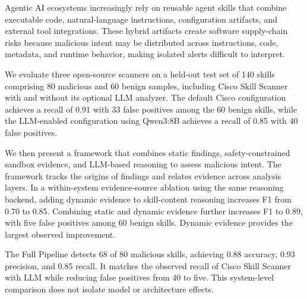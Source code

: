 Agentic AI ecosystems increasingly rely on reusable agent skills
that combine executable code, natural-language instructions,
configuration artifacts, and external tool integrations.
These hybrid artifacts create software supply-chain risks
because malicious intent may be distributed across instructions,
code, metadata, and runtime behavior, making isolated alerts
difficult to interpret.

We evaluate three open-source scanners on a held-out test set
of 140 skills comprising 80 malicious and 60 benign samples,
including Cisco Skill Scanner with and without its
optional LLM analyzer. The default Cisco configuration achieves
a recall of 0.91 with 33 false positives among the 60 benign
skills, while the LLM-enabled configuration using
Qwen3:8B achieves a recall of 0.85 with 40 false positives.

We then present a framework that combines static findings,
safety-constrained sandbox evidence, and LLM-based reasoning
to assess malicious intent. The framework tracks the origins
of findings and relates evidence across analysis layers.
In a within-system evidence-source ablation using the same
reasoning backend, adding dynamic evidence to skill-content
reasoning increases F1 from 0.70 to 0.85. Combining static
and dynamic evidence further increases F1 to 0.89, with
five false positives among 60 benign skills. Dynamic evidence
provides the largest observed improvement.

The Full Pipeline detects 68 of 80 malicious skills,
achieving 0.88 accuracy, 0.93 precision, and 0.85 recall.
It matches the observed recall of Cisco Skill Scanner with
LLM while reducing false positives from 40 to five.
This system-level comparison does not isolate model
or architecture effects.